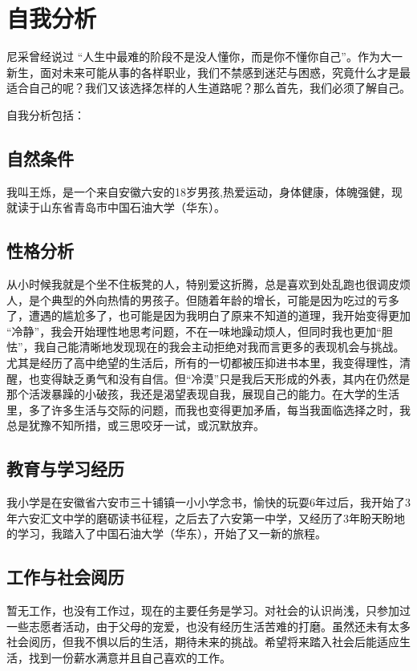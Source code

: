 \documentclass{article}
\begin{document}
\thispagestyle{empty}
\newpage
\setcounter{page}{1}
\section{自我分析}
	尼采曾经说过 “人生中最难的阶段不是没人懂你，而是你不懂你自己”。作为大一新生，面对未来可能从事的各样职业，我们不禁感到迷茫与困惑，究竟什么才是最适合自己的呢？我们又该选择怎样的人生道路呢？那么首先，我们必须了解自己。\par
	自我分析包括：\par
\subsection{自然条件}
我叫王烁，是一个来自安徽六安的18岁男孩,热爱运动，身体健康，体魄强健，现就读于山东省青岛市中国石油大学（华东）。\par
\subsection{性格分析}
从小时候我就是个坐不住板凳的人，特别爱这折腾，总是喜欢到处乱跑也很调皮烦人，是个典型的外向热情的男孩子。但随着年龄的增长，可能是因为吃过的亏多了，遭遇的尴尬多了，也可能是因为我明白了原来不知道的道理，我开始变得更加 “冷静”，我会开始理性地思考问题，不在一味地躁动烦人，但同时我也更加“胆怯”，我自己能清晰地发现现在的我会主动拒绝对我而言更多的表现机会与挑战。尤其是经历了高中绝望的生活后，所有的一切都被压抑进书本里，我变得理性，清醒，也变得缺乏勇气和没有自信。但“冷漠”只是我后天形成的外表，其内在仍然是那个活泼暴躁的小破孩，我还是渴望表现自我，展现自己的能力。在大学的生活里，多了许多生活与交际的问题，而我也变得更加矛盾，每当我面临选择之时，我总是犹豫不知所措，或三思咬牙一试，或沉默放弃。\par
\subsection{教育与学习经历}
我小学是在安徽省六安市三十铺镇一小小学念书，愉快的玩耍6年过后，我开始了3年六安汇文中学的磨砺读书征程，之后去了六安第一中学，又经历了3年盼天盼地的学习，我踏入了中国石油大学（华东），开始了又一新的旅程。\par
\subsection{工作与社会阅历}
暂无工作，也没有工作过，现在的主要任务是学习。对社会的认识尚浅，只参加过一些志愿者活动，由于父母的宠爱，也没有经历生活苦难的打磨。虽然还未有太多社会阅历，但我不惧以后的生活，期待未来的挑战。希望将来踏入社会后能适应生活，找到一份薪水满意并且自己喜欢的工作。\par
\end{document}
